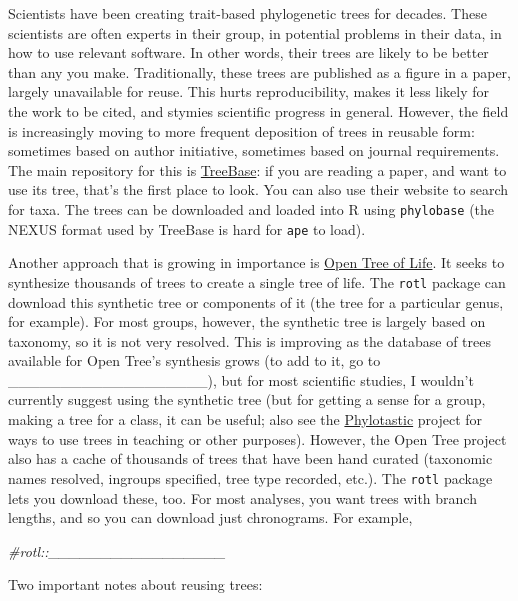 \documentclass[
]{article}
\newenvironment{Shaded}{\begin{snugshade}}{\end{snugshade}}
\newcommand{\CommentTok}[1]{\textcolor[rgb]{0.56,0.35,0.01}{\textit{#1}}}
\begin{document}
Scientists have been creating trait-based phylogenetic trees for decades. These scientists are often experts in their group, in potential problems in their data, in how to use relevant software. In other words, their trees are likely to be better than any you make. Traditionally, these trees are published as a figure in a paper, largely unavailable for reuse. This hurts reproducibility, makes it less likely for the work to be cited, and stymies scientific progress in general. However, the field is increasingly moving to more frequent deposition of trees in reusable form: sometimes based on author initiative, sometimes based on journal requirements. The main repository for this is \href{http://treebase.org}{TreeBase}: if you are reading a paper, and want to use its tree, that's the first place to look. You can also use their website to search for taxa. The trees can be downloaded and loaded into R using \texttt{phylobase} (the NEXUS format used by TreeBase is hard for \texttt{ape} to load).

Another approach that is growing in importance is \href{http://otol.org}{Open Tree of Life}. It seeks to synthesize thousands of trees to create a single tree of life. The \texttt{rotl} package can download this synthetic tree or components of it (the tree for a particular genus, for example). For most groups, however, the synthetic tree is largely based on taxonomy, so it is not very resolved. This is improving as the database of trees available for Open Tree's synthesis grows (to add to it, go to \_\_\_\_\_\_\_\_\_\_\_\_\_\_\_\_\_\_\_), but for most scientific studies, I wouldn't currently suggest using the synthetic tree (but for getting a sense for a group, making a tree for a class, it can be useful; also see the \href{http://www.phylotastic.org}{Phylotastic} project for ways to use trees in teaching or other purposes). However, the Open Tree project also has a cache of thousands of trees that have been hand curated (taxonomic names resolved, ingroups specified, tree type recorded, etc.). The \texttt{rotl} package lets you download these, too. For most analyses, you want trees with branch lengths, and so you can download just chronograms. For example,

\begin{Shaded}
\begin{Highlighting}[]
\CommentTok{\#rotl::\_\_\_\_\_\_\_\_\_\_\_\_\_\_\_\_\_}
\end{Highlighting}
\end{Shaded}

Two important notes about reusing trees:
\end{document}
